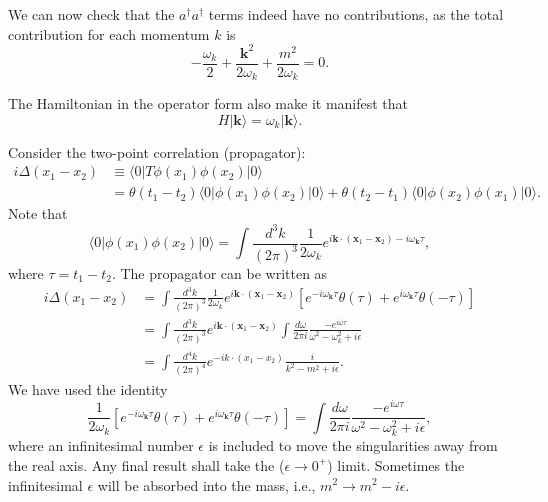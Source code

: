 \documentclass[aps,prb,superscriptaddress,nofootinbib]{revtex4}
\begin{document}
We can now check that the $a^\dagger a^\dagger$ terms indeed have no contributions, as the total contribution for each momentum $k$ is
\begin{equation}
	-\frac{\omega_k}{2} + \frac{\bm k^2}{2\omega_k} + \frac{m^2}{2\omega_k} = 0.
\end{equation}

The Hamiltonian in the operator form also make it manifest that
\begin{equation}
	H |\bm k\rangle = \omega_k |\bm k\rangle.
\end{equation}

Consider the two-point correlation (propagator):
\begin{equation}
\begin{aligned}
	i\Delta(x_1-x_2) &\equiv \langle 0|T \phi(x_1) \phi(x_2) |0\rangle \\
	&= \theta(t_1-t_2) \langle 0|\phi(x_1) \phi(x_2) |0\rangle 
	+ \theta(t_2-t_1) \langle 0|\phi(x_2) \phi(x_1) |0\rangle.
\end{aligned}
\end{equation}
Note that
\begin{equation}
	\langle 0|\phi(x_1) \phi(x_2) |0\rangle
	= \int\frac{d^{3} k}{(2\pi)^{3}}\frac{1}{2\omega_k} e^{i\bm k\cdot (\bm x_1-\bm x_2)-i\omega_{\bm k}\tau},
\end{equation}
where $\tau =t_1-t_2$.
The propagator can be written as
\begin{equation}
\begin{aligned}
	i\Delta(x_1-x_2) 
	&= \int\frac{d^{3} k}{(2\pi)^{3}}\frac{1}{2\omega_k} e^{i\bm k\cdot (\bm x_1-\bm x_2)}\left[e^{-i\omega_{\bm k}\tau}\theta(\tau)+e^{i\omega_{\bm k}\tau}\theta(-\tau)\right] \\
	&= \int\frac{d^{3} k}{(2\pi)^{3}} e^{i\bm k\cdot (\bm x_1-\bm x_2)}\int \frac{d\omega}{2\pi i}\frac{-e^{i\omega\tau}}{\omega^2-\omega_k^2+i\epsilon} \\
	&= \int\frac{d^{4} k}{(2\pi)^{4}} e^{-i k\cdot (x_1-x_2)}\frac{i}{k^2-m^2+i\epsilon}.
\end{aligned}
\end{equation}
We have used the identity
\begin{equation*}
	\frac{1}{2\omega_k} \left[e^{-i\omega_{\bm k}\tau}\theta(\tau)+e^{i\omega_{\bm k}\tau}\theta(-\tau)\right] 
	= \int \frac{d\omega}{2\pi i} \frac{-e^{i\omega\tau}}{\omega^2-\omega_k^2+i\epsilon},
\end{equation*}
where an infinitesimal number $\epsilon$ is included to move the singularities away from the real axis.
Any final result shall take the ($\epsilon \rightarrow 0^+$) limit.
Sometimes the infinitesimal $\epsilon$ will be absorbed into the mass, i.e., $m^2 \rightarrow m^2-i\epsilon$.
\end{document}
